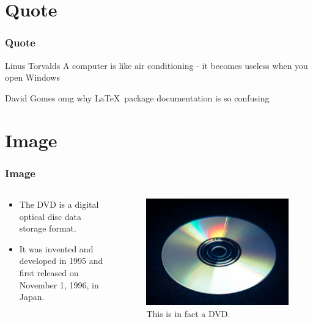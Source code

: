 \documentclass[aspectratio=169]{beamer}
\begin{document}
\section{Quote}
\begin{frame}
\frametitle{Quote}

\begin{aquote}{Linus Torvalds}
A computer is like air conditioning - it becomes useless when you open Windows
\end{aquote}

\begin{aquote}{David Gomes}
omg why \LaTeX\ package documentation is so confusing
\end{aquote}

\end{frame}

\section{Image}
\begin{frame}
\frametitle{Image}

\begin{center}
\begin{columns}
\begin{column}{.5\textwidth}
\begin{itemize}
    \item The DVD is a digital optical disc data storage format.
    \item It was invented and developed in 1995 and first released on November 1, 1996, in Japan.
\end{itemize}
\end{column}

\begin{column}{.5\textwidth}
\begin{figure}
\centering
\includegraphics[width=\textwidth]{dvd.jpg}
\caption{This is in fact a DVD.}
\end{figure}
\end{column}
\end{columns}
\end{center}

\end{frame}
\end{document}

